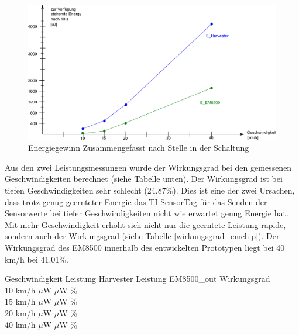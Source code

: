 \begin{figure}[ht]
    \includegraphics[width=1\textwidth]{4Resultate/imag/EnergyGewinnNachStelle.png} 
    \caption{Energiegewinn Zusammengefasst nach Stelle in der Schaltung}
    \label{zsmEnergyGewinn}
\end{figure}

Aus den zwei Leistungsmessungen wurde der Wirkungsgrad bei den gemessenen Geschwindigkeiten berechnet (siehe Tabelle unten). Der Wirkungsgrad ist bei tiefen Geschwindigkeiten sehr schlecht (24.87\thinspace\%). Dies ist eine der zwei Ursachen, dass trotz genug geernteter Energie das TI-SensorTag für das Senden der Sensorwerte bei tiefer Geschwindigkeiten nicht wie erwartet genug Energie hat. Mit mehr Geschwindigkeit erhöht sich nicht nur die geerntete Leistung rapide, sondern auch der Wirkungsgrad (siehe Tabelle \ref{wirkungsgrad_emchip}). Der Wirkungsgrad des EM8500 innerhalb des entwickelten Prototypen liegt bei 40 km/h  bei 41.01\thinspace\%.  

\begin{minipage}{\textwidth}
    \label{wirkungsgrad_emchip}
    \begin{tabbing}
        Geschwindigkeit \quad\= Leistung Harvester \quad\= Leistung EM8500\_out \quad\= Wirkungsgrad\\[0.8ex]
        10 km/h    $\mu$W    $\mu$W \thinspace\%  \\
        15 km/h    $\mu$W   $\mu$W \thinspace\%  \\
        20 km/h  $\mu$W   $\mu$W \thinspace\%  \\
        40 km/h  $\mu$W  $\mu$W \thinspace\%  \\
    \end{tabbing}
\end{minipage}  


